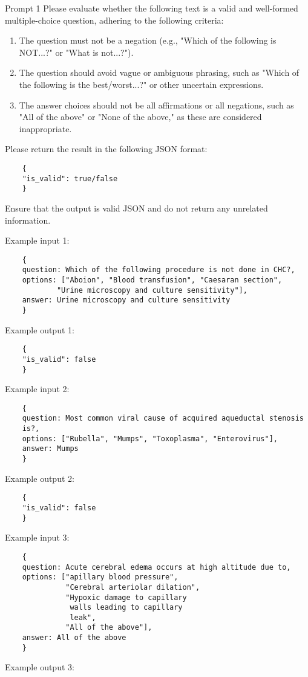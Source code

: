 \begin{promptbox}{Prompt 1}
Please evaluate whether the following text is a valid and well-formed multiple-choice question, adhering to the following criteria:
\begin{enumerate}
\item The question must not be a negation (e.g., "Which of the following is NOT...?" or "What is not...?").
\item The question should avoid vague or ambiguous phrasing, such as "Which of the following is the best/worst...?" or other uncertain expressions.
\item The answer choices should not be all affirmations or all negations, such as "All of the above" or "None of the above," as these are considered inappropriate.
\end{enumerate}

Please return the result in the following JSON format:

\begin{verbatim}
    {
    "is_valid": true/false
    }
\end{verbatim}

Ensure that the output is valid JSON and do not return any unrelated information.

Example input 1:

\begin{verbatim}
    {
    question: Which of the following procedure is not done in CHC?,
    options: ["Aboion", "Blood transfusion", "Caesaran section", 
            "Urine microscopy and culture sensitivity"],
    answer: Urine microscopy and culture sensitivity
    }
\end{verbatim}

Example output 1:

\begin{verbatim}
    {
    "is_valid": false
    }
\end{verbatim}
Example input 2:

\begin{verbatim}
    {
    question: Most common viral cause of acquired aqueductal stenosis 
    is?,
    options: ["Rubella", "Mumps", "Toxoplasma", "Enterovirus"],
    answer: Mumps
    }
\end{verbatim}
Example output 2:

\begin{verbatim}
    {
    "is_valid": false
    }
\end{verbatim}
Example input 3:

\begin{verbatim}
    {
    question: Acute cerebral edema occurs at high altitude due to,
    options: ["apillary blood pressure",     
              "Cerebral arteriolar dilation", 
              "Hypoxic damage to capillary 
               walls leading to capillary 
               leak",
              "All of the above"],
    answer: All of the above
    }
\end{verbatim}
Example output 3:


\end{promptbox}
